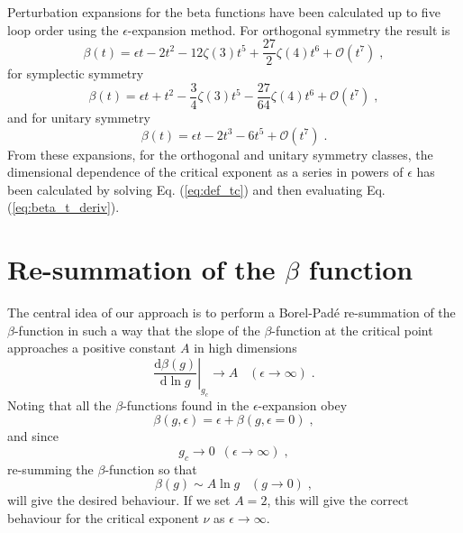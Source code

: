 \documentclass[singlecolumn]{jpsj3}
\begin{document}
Perturbation expansions for the beta functions have been calculated up to five loop order using the $\epsilon$-expansion method.\cite{Wegner89, Hikami92}
For orthogonal symmetry the result is
\begin{equation}\label{eq:beta_o}
  \beta (t) = \epsilon t - 2t^2 -12\zeta(3)t^5 + \frac{27}{2}\zeta(4)t^6 + \mathcal{O}(t^7) \;,
\end{equation}
for symplectic symmetry
\begin{equation}\label{eq:beta_s}
  \beta (t) = \epsilon t + t^2 -\frac{3}{4}\zeta(3)t^5 -\frac{27}{64}\zeta(4)t^6  + \mathcal{O}(t^7) \;,
\end{equation}
and for unitary symmetry
\begin{equation}\label{eq:beta_u}
  \beta (t) = \epsilon t - 2t^3 - 6t^5 + \mathcal{O}(t^7) \;.
\end{equation}
From these expansions, for the orthogonal and unitary symmetry classes, the dimensional dependence of the critical exponent as a series in powers of $\epsilon$
has been calculated by solving Eq. (\ref{eq:def_tc}) and then evaluating Eq. (\ref{eq:beta_t_deriv}).


\section{Re-summation of the $\beta$ function} \label{sec:beta_resum}

The central idea of our approach is to perform a Borel-Pad\'e re-summation of the $\beta$-function in such a way that the slope of the $\beta$-function at the critical point approaches a positive constant $A$ in high dimensions
\begin{equation}\label{eq:betagc}
	\left. \frac{\mathrm{d} \beta\left(g\right)}{\mathrm{d} \ln g} \right|_{g_c} \rightarrow A \;\;\; (\epsilon \rightarrow \infty) \;.
\end{equation}
Noting that all  the $\beta$-functions found in the $\epsilon$-expansion obey
\begin{equation}\label{eq:beta_g_eps_dep}
  \beta(g, \epsilon) = \epsilon + \beta(g, \epsilon = 0) \;,
\end{equation}
and since
\begin{equation}\label{eq:gcasymp}
 g_c \rightarrow 0 \,\,\, (\epsilon \rightarrow \infty) \;,
\end{equation}
re-summing the $\beta$-function so that
\begin{equation}\label{eq:betag2}
	\beta(g) \sim A \ln g \;\;\; (g \rightarrow 0) \;,
\end{equation}
will give the desired behaviour.
If we set $A=2$, this will give the correct behaviour for the critical exponent $\nu$ as $\epsilon \rightarrow \infty$.
\end{document}
